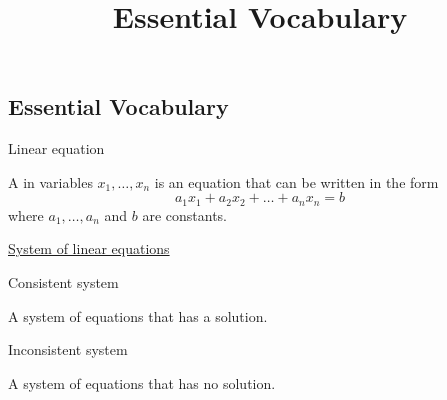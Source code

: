 \documentclass{ximera}
\title{Essential Vocabulary} \license{CC BY-NC-SA 4.0}
\begin{document}
\begin{abstract}
\end{abstract}
\maketitle


\begin{onlineOnly}
\section*{Essential Vocabulary}
\end{onlineOnly}

Linear equation
\begin{expandable}
    A  in variables $x_1, \ldots, x_n$ is an equation that can be written in the form
$$a_1x_1+a_2x_2+\ldots +a_nx_n=b$$
where $a_1,\ldots ,a_n$ and $b$ are constants.
\end{expandable}

\begin{center}
\end{center}

\href{https://ximera.osu.edu/oerlinalg/LinearAlgebra/SYS-0010/main}{System of linear equations}

\begin{center}
\end{center}

Consistent system
\begin{expandable}
    A system of equations that has a solution.
\end{expandable}

\begin{center}
\end{center}

Inconsistent system
\begin{expandable}
    A system of equations that has no solution.
\end{expandable}
\end{document}
